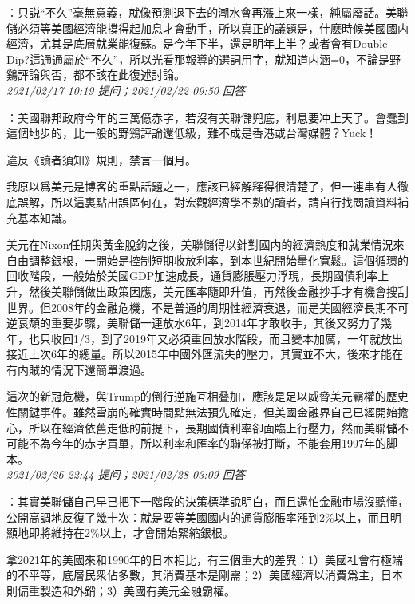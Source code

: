 \documentclass[twocolumn]{ctexart}
\begin{document}
：只説“不久”毫無意義，就像預測退下去的潮水會再漲上來一樣，純屬廢話。美聯儲必須等美國經濟能撐得起加息才會動手，所以真正的議題是，什麽時候美國國内經濟，尤其是底層就業能復蘇。是今年下半，還是明年上半？或者會有Double Dip?這通通屬於“不久”，所以光看那報導的選詞用字，就知道内涵=0，不論是野鷄評論與否，都不該在此復述討論。
\\

\textit{\hfill\noindent\small 2021/02/17 10:19 提问；2021/02/22 09:50 回答}

：美國聯邦政府今年的三萬億赤字，若沒有美聯儲兜底，利息要冲上天了。會蠢到這個地步的，比一般的野鷄評論還低級，難不成是香港或台灣媒體？Yuck！

違反《讀者須知》規則，禁言一個月。


我原以爲美元是博客的重點話題之一，應該已經解釋得很清楚了，但一連串有人徹底誤解，所以這裏點出誤區何在，對宏觀經濟學不熟的讀者，請自行找閲讀資料補充基本知識。

美元在Nixon任期與黃金脫鈎之後，美聯儲得以針對國内的經濟熱度和就業情況來自由調整銀根，一開始是控制短期收放利率，到本世紀開始量化寬鬆。這個循環的回收階段，一般始於美國GDP加速成長，通貨膨脹壓力浮現，長期國債利率上升，然後美聯儲做出政策因應，美元匯率隨即升值，再然後金融抄手才有機會搜刮世界。但2008年的金融危機，不是普通的周期性經濟衰退，而是美國經濟長期不可逆衰頹的重要步驟，美聯儲一連放水6年，到2014年才敢收手，其後又努力了幾年，也只收回1/3，到了2019年又必須重回放水階段，而且變本加厲，一年就放出接近上次6年的總量。所以2015年中國外匯流失的壓力，其實並不大，後來才能在有内賊的情況下還簡單渡過。

這次的新冠危機，與Trump的倒行逆施互相叠加，應該是足以威脅美元霸權的歷史性關鍵事件。雖然雪崩的確實時間點無法預先確定，但美國金融界自己已經開始擔心，所以在經濟依舊走低的前提下，長期國債利率卻面臨上行壓力，然而美聯儲不可能不為今年的赤字買單，所以利率和匯率的聯係被打斷，不能套用1997年的脚本。
\\

\textit{\hfill\noindent\small 2021/02/26 22:44 提问；2021/02/28 03:09 回答}

：其實美聯儲自己早已把下一階段的決策標準說明白，而且還怕金融市場沒聽懂，公開高調地反復了幾十次：就是要等美國國内的通貨膨脹率漲到2\%以上，而且明顯地即將維持在2\%以上，才會開始緊縮銀根。

拿2021年的美國來和1990年的日本相比，有三個重大的差異：1）美國社會有極端的不平等，底層民衆佔多數，其消費基本是剛需；2）美國經濟以消費爲主，日本則偏重製造和外銷；3）美國有美元金融霸權。
\end{document}
